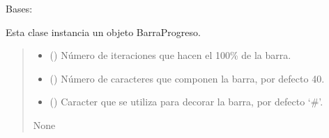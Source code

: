 \documentclass[letterpaper,10pt,english]{sphinxmanual}
\begin{document}
\begin{fulllineitems}
\label{\detokenize{myutils:myutils.BarraProgreso}}
\pysigstartsignatures
{}
\pysigstopsignatures
\sphinxAtStartPar
Bases: 

\sphinxAtStartPar
Esta clase instancia un objeto BarraProgreso.
\begin{quote}\begin{description}
\begin{itemize}
\item {} 
\sphinxAtStartPar
{} () \textendash{} Número de iteraciones que hacen el 100\% de la barra.

\item {} 
\sphinxAtStartPar
{} (\sphinxstyleliteralemphasis{\sphinxupquote{, }}) \textendash{} Número de caracteres que componen la barra, por defecto 40.

\item {} 
\sphinxAtStartPar
{} (\sphinxstyleliteralemphasis{\sphinxupquote{, }}) \textendash{} Caracter que se utiliza para decorar la barra, por defecto ‘\#’.

\end{itemize}

\sphinxAtStartPar
None

\end{description}\end{quote}

\end{fulllineitems}

\end{document}
